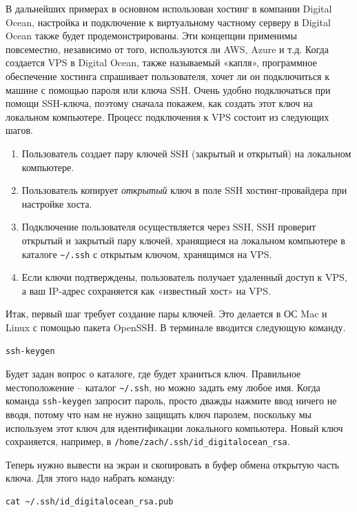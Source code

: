 \documentclass[12pt]{article}
\providecommand{\tightlist}{%
  \setlength{\itemsep}{0pt}\setlength{\parskip}{0pt}}
\begin{document}
В дальнейших примерах в основном использован хостинг в компании Digital
Ocean, настройка и подключение к виртуальному частному серверу в Digital
Ocean также будет продемонстрированы. Эти концепции применимы
повсеместно, независимо от того, используются ли AWS, Azure и т.д. Когда
создается VPS в Digital Ocean, также называемый «капля», программное
обеспечение хостинга спрашивает пользователя, хочет ли он подключиться к
машине с помощью пароля или ключа SSH. Очень удобно подключаться при
помощи SSH-ключа, поэтому сначала покажем, как создать этот ключ на
локальном компьютере. Процесс подключения к VPS состоит из следующих
шагов.
\begin{enumerate}
\tightlist
\item
  Пользователь создает пару ключей SSH (закрытый и открытый) на
  локальном компьютере.
\item
  Пользователь копирует \emph{открытый} ключ в поле SSH
  хостинг-провайдера при настройке хоста.
\item
  Подключение пользователя осуществляется через SSH, SSH проверит
  открытый и закрытый пару ключей, хранящиеся на локальном компьютере в
  каталоге \texttt{\textasciitilde{}/.ssh} с открытым ключом, хранящимся
  на VPS.
\item
  Если ключи подтверждены, пользователь получает удаленный доступ к VPS,
  а ваш IP-адрес сохраняется как «известный хост» на VPS.
\end{enumerate}

Итак, первый шаг требует создание пары ключей. Это делается в ОС Mac и
Linux с помощью пакета OpenSSH. В терминале вводится следующую команду.
\begin{verbatim}
ssh-keygen
\end{verbatim}

Будет задан вопрос о каталоге, где будет храниться ключ. Правильное
местоположение -- каталог \texttt{\textasciitilde{}/.ssh}, но можно
задать ему любое имя. Когда команда \texttt{ssh-keygen} запросит пароль, просто
дважды нажмите ввод ничего не вводя, потому что нам не нужно защищать
ключ паролем, поскольку мы используем этот ключ для идентификации
локального компьютера. Новый ключ сохраняется, например, в
\texttt{/home/zach/.ssh/id\_digitalocean\_rsa}.

Теперь нужно вывести на экран и скопировать в буфер обмена открытую
часть ключа. Для этого надо набрать команду:
\begin{verbatim}
cat ~/.ssh/id_digitalocean_rsa.pub
\end{verbatim}
\end{document}
